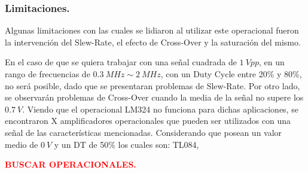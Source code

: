 \subsubsection{Limitaciones.}
Algunas limitaciones con las cuales se lidiaron al utilizar este operacional fueron la intervención del Slew-Rate, el efecto de Cross-Over y la saturación del mismo.

En el caso de que se quiera trabajar con una señal cuadrada de $1 \ Vpp$, en un rango de frecuencias de $0.3 \ MHz \sim 2 \ MHz$, con un Duty Cycle entre 20\% y 80\%, no será posible, dado que se presentaran problemas de Slew-Rate. Por otro lado, se observarán problemas de Cross-Over cuando la media de la señal no supere los $0.7 \ V$.
Viendo que el operacional LM324 no funciona para dichas aplicaciones, se encontraron X amplificadores operacionales que pueden ser utilizados con una señal de las características mencionadas. Considerando que posean un valor medio de $0 \ V$ y un DT de 50\% los cuales son: TL084,

\begin{center}
\textcolor{red}{\textbf{BUSCAR OPERACIONALES.}}
\end{center}

